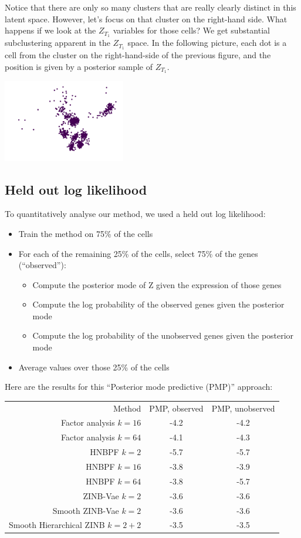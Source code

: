 Notice that there are only so many clusters that are really clearly distinct in this latent space.  However, let's focus on that cluster on the right-hand side.  What happens if we look at the $Z_{T_1}$ variables for those cells?  We get substantial subclustering apparent in the $Z_{T_1}$ space.  In the following picture, each dot is a cell from the cluster on the right-hand-side of the previous figure, and the position is given by a posterior sample of $Z_{T_1}$.

\includegraphics[width=0.4\textwidth]{pics/Z2}


\subsection{Held out log likelihood}

To quantitatively analyse our method, we used a held out log likelihood:

\begin{itemize}
\item Train the method on 75\% of the cells
\item For each of the remaining 25\% of the cells, select 75\% of the genes (``observed''):
  \begin{itemize}
  \item Compute the posterior mode of Z given the expression of those genes
  \item Compute the log probability of the observed genes given the posterior mode
  \item Compute the log probability of the unobserved genes given the posterior mode
  \end{itemize}
\item Average values over those 25\% of the cells
\end{itemize}

Here are the results for this ``Posterior mode predictive (PMP)'' approach:

\begin{tabular}{r|cc}
Method & PMP, observed & PMP, unobserved \\
Factor analysis $k=16$ & -4.2 & -4.2 \\
Factor analysis $k=64$ & -4.1 & -4.3 \\
HNBPF $k=2$ & -5.7 & -5.7 \\
HNBPF $k=16$ & -3.8 & -3.9 \\
HNBPF $k=64$ & -3.8 & -5.7 \\
ZINB-Vae $k=2$ & -3.6 & -3.6 \\
Smooth ZINB-Vae $k=2$ & -3.6 & -3.6 \\
Smooth Hierarchical ZINB $k=2+2$ & -3.5 & -3.5 \\
\hline
\end{tabular}

